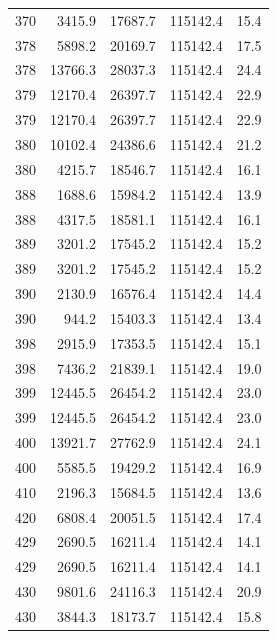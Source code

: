 \begin{longtable}{rrrrr}
    370 & \num{3415.9} & \num{17687.7} & \num{115142.4} & 15.4 \\
    378 & \num{5898.2} & \num{20169.7} & \num{115142.4} & 17.5 \\
    378 & \num{13766.3} & \num{28037.3} & \num{115142.4} & 24.4 \\
    379 & \num{12170.4} & \num{26397.7} & \num{115142.4} & 22.9 \\
    379 & \num{12170.4} & \num{26397.7} & \num{115142.4} & 22.9 \\
    380 & \num{10102.4} & \num{24386.6} & \num{115142.4} & 21.2 \\
    380 & \num{4215.7} & \num{18546.7} & \num{115142.4} & 16.1 \\
    388 & \num{1688.6} & \num{15984.2} & \num{115142.4} & 13.9 \\
    388 & \num{4317.5} & \num{18581.1} & \num{115142.4} & 16.1 \\
    389 & \num{3201.2} & \num{17545.2} & \num{115142.4} & 15.2 \\
    389 & \num{3201.2} & \num{17545.2} & \num{115142.4} & 15.2 \\
    390 & \num{2130.9} & \num{16576.4} & \num{115142.4} & 14.4 \\
    390 & \num{944.2} & \num{15403.3} & \num{115142.4} & 13.4 \\
    398 & \num{2915.9} & \num{17353.5} & \num{115142.4} & 15.1 \\
    398 & \num{7436.2} & \num{21839.1} & \num{115142.4} & 19.0 \\
    399 & \num{12445.5} & \num{26454.2} & \num{115142.4} & 23.0 \\
    399 & \num{12445.5} & \num{26454.2} & \num{115142.4} & 23.0 \\
    400 & \num{13921.7} & \num{27762.9} & \num{115142.4} & 24.1 \\
    400 & \num{5585.5} & \num{19429.2} & \num{115142.4} & 16.9 \\
    410 & \num{2196.3} & \num{15684.5} & \num{115142.4} & 13.6 \\
    420 & \num{6808.4} & \num{20051.5} & \num{115142.4} & 17.4 \\
    429 & \num{2690.5} & \num{16211.4} & \num{115142.4} & 14.1 \\
    429 & \num{2690.5} & \num{16211.4} & \num{115142.4} & 14.1 \\
    430 & \num{9801.6} & \num{24116.3} & \num{115142.4} & 20.9 \\
    430 & \num{3844.3} & \num{18173.7} & \num{115142.4} & 15.8 \\

\end{longtable}
